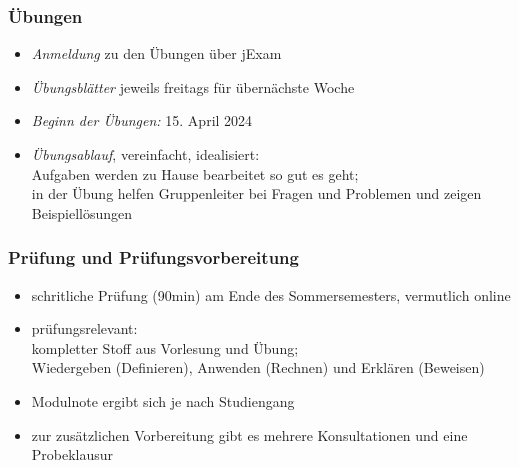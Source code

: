 \documentclass[aspectratio=1610,onlymath]{beamer}
\begin{document}
\begin{frame}\frametitle{Übungen}
\begin{itemize}
\item \emph{Anmeldung} zu den Übungen über jExam
\item \emph{Übungsblätter} jeweils freitags für übernächste Woche
\item \emph{Beginn der Übungen:} 15. April 2024
\item \emph{Übungsablauf}, vereinfacht, idealisiert:\\
	Aufgaben werden zu Hause bearbeitet so gut es geht;\\
	in der Übung helfen Gruppenleiter bei Fragen und Problemen und zeigen Beispiellösungen
\end{itemize}

\end{frame}


\begin{frame}\frametitle{Prüfung und Prüfungsvorbereitung}
\begin{itemize}
\item schritliche Prüfung (90min) am Ende des Sommersemesters, vermutlich online
\item prüfungsrelevant:\\
	kompletter Stoff aus Vorlesung \alert{und} Übung;\\
	Wiedergeben (Definieren), Anwenden (Rechnen) und Erklären (Beweisen)
\item Modulnote ergibt sich je nach Studiengang
\item zur zusätzlichen Vorbereitung gibt es \alert{mehrere Konsultationen} und \alert{eine Probeklausur}
\end{itemize}

\end{frame}
\end{document}
